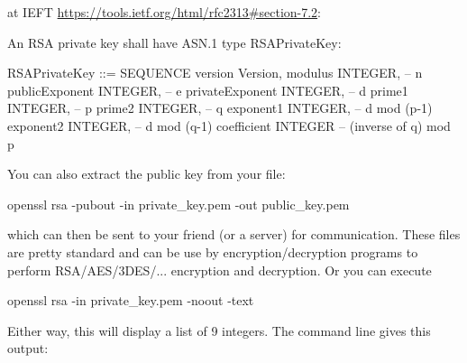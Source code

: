at IEFT 
\url{https://tools.ietf.org/html/rfc2313#section-7.2}:
{\scriptsize
\begin{console}
An RSA private key shall have ASN.1 type RSAPrivateKey:

   RSAPrivateKey ::= SEQUENCE {
     version Version,
     modulus INTEGER, -- n
     publicExponent INTEGER, -- e
     privateExponent INTEGER, -- d
     prime1 INTEGER, -- p
     prime2 INTEGER, -- q
     exponent1 INTEGER, -- d mod (p-1)
     exponent2 INTEGER, -- d mod (q-1)
     coefficient INTEGER -- (inverse of q) mod p }
\end{console}
}
You can also extract the public key from your file:
{\small
\begin{console}
openssl rsa -pubout -in private_key.pem -out public_key.pem
\end{console}
}
which can then be sent to your friend (or a server)
for communication.
These files are pretty standard and can be use by
encryption/decryption programs to perform
RSA/AES/3DES/... encryption and decryption.
Or you can execute
{\small
\begin{console}
openssl rsa -in private_key.pem -noout -text
\end{console}
}
Either way, this will display a list of 9 integers.
The command line gives this output:
